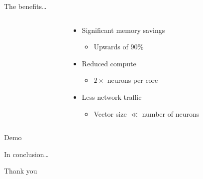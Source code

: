 \documentclass[t]{beamer}
\begin{document}
\begin{frame}{The benefits\ldots}
  \begin{columns}[c]
    \begin{column}{.35\textwidth}%
      
    \end{column}\hfill
    \begin{column}{.62\textwidth}
      \begin{itemize}
        \item Significant memory savings
        \begin{itemize}
          \item<2-> Upwards of 90\%
        \end{itemize}
        \item Reduced compute
        \begin{itemize}
          \item<3-> $2\times$ neurons per core
        \end{itemize}
        \item Less network traffic
        \begin{itemize}
          \item<4-> Vector size $\ll$ number of neurons
        \end{itemize}
      \end{itemize}
    \end{column}
  \end{columns}
\end{frame}

\begin{darkframes}
  \begin{frame}{\hspace{1em}}
    \centering
    \vfill
    {\huge Demo}
    \vfill
  \end{frame}
\end{darkframes}

\begin{frame}{In conclusion\ldots}
  
\end{frame}

\begin{darkframes}
  \begin{frame}{\hspace{1em}}
    \centering
    \vfill
    {\huge Thank you}
    \vfill
  \end{frame}
\end{darkframes}
  
\end{document}
